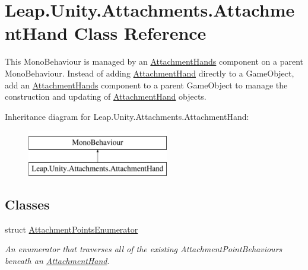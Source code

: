 \hypertarget{class_leap_1_1_unity_1_1_attachments_1_1_attachment_hand}{}\section{Leap.\+Unity.\+Attachments.\+Attachment\+Hand Class Reference}
\label{class_leap_1_1_unity_1_1_attachments_1_1_attachment_hand}


This Mono\+Behaviour is managed by an \mbox{\hyperlink{class_leap_1_1_unity_1_1_attachments_1_1_attachment_hands}{Attachment\+Hands}} component on a parent Mono\+Behaviour. Instead of adding \mbox{\hyperlink{class_leap_1_1_unity_1_1_attachments_1_1_attachment_hand}{Attachment\+Hand}} directly to a Game\+Object, add an \mbox{\hyperlink{class_leap_1_1_unity_1_1_attachments_1_1_attachment_hands}{Attachment\+Hands}} component to a parent Game\+Object to manage the construction and updating of \mbox{\hyperlink{class_leap_1_1_unity_1_1_attachments_1_1_attachment_hand}{Attachment\+Hand}} objects.  


Inheritance diagram for Leap.\+Unity.\+Attachments.\+Attachment\+Hand\+:\begin{figure}[H]
\begin{center}
\leavevmode
\includegraphics[height=2.000000cm]{class_leap_1_1_unity_1_1_attachments_1_1_attachment_hand}
\end{center}
\end{figure}
\subsection*{Classes}
\begin{DoxyCompactItemize}
\item 
struct \mbox{\hyperlink{struct_leap_1_1_unity_1_1_attachments_1_1_attachment_hand_1_1_attachment_points_enumerator}{Attachment\+Points\+Enumerator}}
\begin{DoxyCompactList}\small\item\em An enumerator that traverses all of the existing Attachment\+Point\+Behaviours beneath an \mbox{\hyperlink{class_leap_1_1_unity_1_1_attachments_1_1_attachment_hand}{Attachment\+Hand}}. \end{DoxyCompactList}\end{DoxyCompactItemize}
